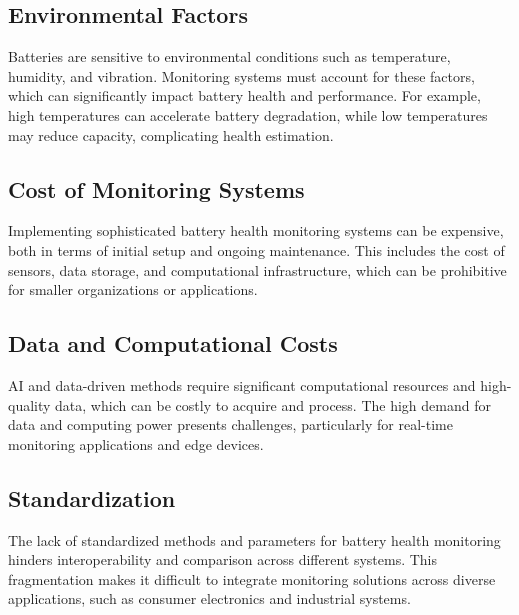 \subsection{Environmental Factors}
Batteries are sensitive to environmental conditions such as temperature, humidity, and vibration. 
Monitoring systems must account for these factors, which can significantly impact battery health and performance. 
For example, high temperatures can accelerate battery degradation, while low temperatures may reduce capacity, complicating health estimation.

\subsection{Cost of Monitoring Systems}
Implementing sophisticated battery health monitoring systems can be expensive, both in terms of initial setup and ongoing maintenance. 
This includes the cost of sensors, data storage, and computational infrastructure, which can be prohibitive for smaller organizations or applications.

\subsection{Data and Computational Costs}
AI and data-driven methods require significant computational resources and high-quality data, which can be costly to acquire and process. 
The high demand for data and computing power presents challenges, particularly for real-time monitoring applications and edge devices.

\subsection{Standardization}
The lack of standardized methods and parameters for battery health monitoring hinders interoperability and comparison across different systems. 
This fragmentation makes it difficult to integrate monitoring solutions across diverse applications, such as consumer electronics and industrial systems.





